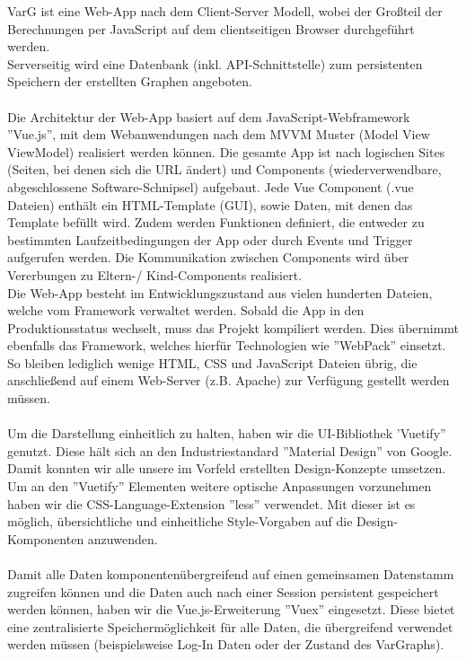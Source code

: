 \documentclass[twoside]{report}
\begin{document}
VarG ist eine Web-App nach dem Client-Server Modell, wobei der Großteil der Berechnungen per JavaScript auf dem clientseitigen Browser
durchgeführt werden.
\\Serverseitig wird eine Datenbank (inkl. API-Schnittstelle) zum persistenten Speichern der erstellten Graphen angeboten.
\\
\\Die Architektur der Web-App basiert auf dem JavaScript-Webframework ''Vue.js'',
mit dem Webanwendungen nach dem MVVM Muster (Model View ViewModel) realisiert werden können. Die gesamte App ist nach logischen
Sites (Seiten, bei denen sich die URL ändert) und Components (wiederverwendbare, abgeschlossene Software-Schnipsel) aufgebaut.
Jede Vue Component (.vue Dateien) enthält ein HTML-Template (GUI), sowie Daten, mit denen das Template befüllt wird. Zudem werden
Funktionen definiert, die entweder zu bestimmten Laufzeitbedingungen der App oder durch Events und Trigger aufgerufen werden.
Die Kommunikation zwischen Components wird über Vererbungen zu Eltern-/ Kind-Components realisiert.
\\Die Web-App besteht im Entwicklungszustand aus vielen hunderten Dateien, welche vom Framework verwaltet werden. Sobald
die App in den Produktionsstatus wechselt, muss das Projekt kompiliert werden. Dies übernimmt ebenfalls das Framework, welches
hierfür Technologien wie ''WebPack'' einsetzt. So bleiben lediglich wenige HTML, CSS und JavaScript Dateien übrig, die anschließend
auf einem Web-Server (z.B. Apache) zur Verfügung gestellt werden müssen.
\\
\\Um die Darstellung einheitlich zu halten, haben wir die UI-Bibliothek 'Vuetify'' genutzt. Diese hält sich an den Industriestandard
''Material Design'' von Google. Damit konnten wir alle unsere im Vorfeld erstellten Design-Konzepte umsetzen. Um an den ''Vuetify'' Elementen
weitere optische Anpassungen vorzunehmen haben wir die CSS-Language-Extension ''less'' verwendet. Mit dieser ist es möglich, übersichtliche und
einheitliche Style-Vorgaben auf die Design-Komponenten anzuwenden.
\\
\\Damit alle Daten komponentenübergreifend auf einen gemeinsamen Datenstamm zugreifen können und die Daten auch nach einer Session persistent
gespeichert werden können, haben wir die Vue.js-Erweiterung ''Vuex'' eingesetzt. Diese bietet eine zentralisierte Speichermöglichkeit
für alle Daten, die übergreifend verwendet werden müssen (beispielsweise Log-In Daten oder der Zustand des VarGraphs).
\end{document}
